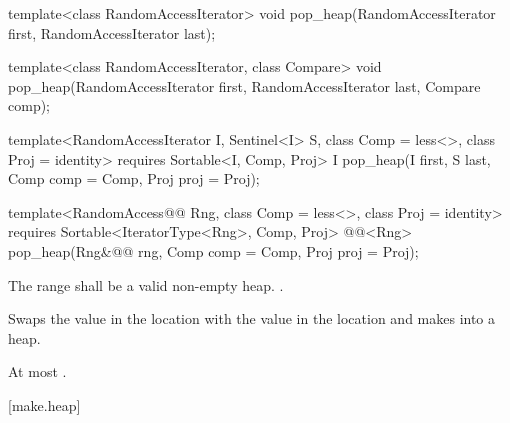 %
\begin{removedblock}
\begin{itemdecl}
template<class RandomAccessIterator>
  void pop_heap(RandomAccessIterator first, RandomAccessIterator last);

template<class RandomAccessIterator, class Compare>
  void pop_heap(RandomAccessIterator first, RandomAccessIterator last,
                Compare comp);
\end{itemdecl}
\end{removedblock}
\begin{addedblock}
\begin{itemdecl}
template<RandomAccessIterator I, Sentinel<I> S, class Comp = less<>,
    class Proj = identity>
  requires Sortable<I, Comp, Proj>
  I pop_heap(I first, S last, Comp comp = Comp{}, Proj proj = Proj{});

template<RandomAccess@@ Rng, class Comp = less<>, class Proj = identity>
  requires Sortable<IteratorType<Rng>, Comp, Proj>
  @@<Rng>
    pop_heap(Rng&@\newtxt{\&}@ rng, Comp comp = Comp{}, Proj proj = Proj{});
\end{itemdecl}
\end{addedblock}

\begin{itemdescr}
\pnum
\requires
The range
shall be a valid non-empty heap.
.

\pnum
\effects
Swaps the value in the location 
with the value in the location
and makes
into a heap.

\begin{addedblock}
\pnum
\returns {}
\end{addedblock}

\pnum
\complexity
At most
.
\end{itemdescr}

[make.heap]{}

